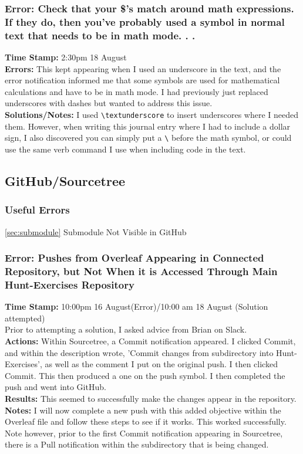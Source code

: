\documentclass{article}
\begin{document}
\begin{FlushLeft}
\subsubsection{Error: Check that your \$'s match around math expressions. If they do, then you've probably used a symbol in normal text that needs to be in math mode. . .}
\textbf{Time Stamp:} 2:30pm 18 August\\
\textbf{Errors:} This kept appearing when I used an underscore in the text, and the error notification informed me that some symbols are used for mathematical calculations and have to be in math mode. I had previously just replaced underscores with dashes but wanted to address this issue.\\
\textbf{Solutions/Notes:} I used \verb|\textunderscore| to insert underscores where I needed them. However, when writing this journal entry where I had to include a dollar sign, I also discovered you can simply put a \verb|\| before the math symbol, or could use the same verb command I use when including code in the text.

\subsection{GitHub/Sourcetree}

\subsubsection{Useful Errors}
\autoref{sec:submodule} Submodule Not Visible in GitHub

\subsubsection{Error: Pushes from Overleaf Appearing in Connected Repository, but Not When it is Accessed Through Main Hunt-Exercises Repository}
\textbf{Time Stamp:} 10:00pm 16 August(Error)/10:00 am 18 August (Solution attempted)\\
Prior to attempting a solution, I asked advice from Brian on Slack.\\
\textbf{Actions:} Within Sourcetree, a Commit notification appeared. I clicked Commit, and within the description wrote, 'Commit changes from subdirectory into Hunt-Exercises', as well as the comment I put on the original push. I then clicked Commit. This then produced a one on the push symbol. I then completed the push and went into GitHub.\\
\textbf{Results:} This seemed to successfully make the changes appear in the repository.\\
\textbf{Notes:} I will now complete a new push with this added objective within the Overleaf file and follow these steps to see if it works. This worked successfully. Note however, prior to the first Commit notification appearing in Sourcetree, there is a Pull notification within the subdirectory that is being changed.


\end{FlushLeft}
\end{document}
